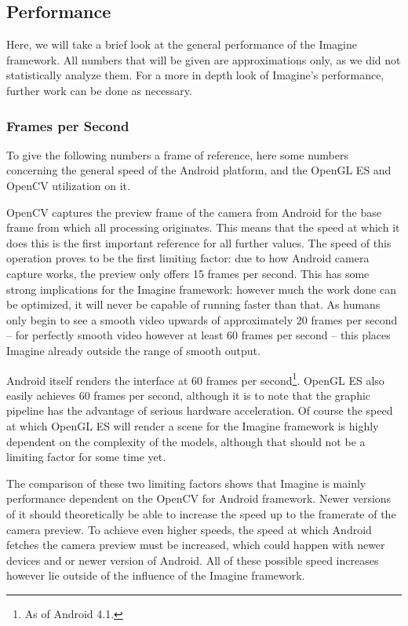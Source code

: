 \subsection{Performance}
\label{performance}

Here, we will take a brief look at the general performance of the Imagine framework.
All numbers that will be given are approximations only, as we did not statistically analyze them.
For a more in depth look of Imagine's performance, further work can be done as necessary.

\subsubsection{Frames per Second}

To give the following numbers a frame of reference, here some numbers concerning the general speed of the Android platform, and the OpenGL ES and OpenCV utilization on it.

OpenCV captures the preview frame of the camera from Android for the base frame from which all processing originates.
This means that the speed at which it does this is the first important reference for all further values.
The speed of this operation proves to be the first limiting factor: due to how Android camera capture works, the preview only offers 15 frames per second.
This has some strong implications for the Imagine framework: however much the work done can be optimized, it will never be capable of running faster than that.
As humans only begin to see a smooth video upwards of approximately 20 frames per second – for perfectly smooth video however at least 60 frames per second – this places Imagine already outside the range of smooth output.

Android itself renders the interface at 60 frames per second\footnote{As of Android 4.1.}.
OpenGL ES also easily achieves 60 frames per second, although it is to note that the graphic pipeline has the advantage of serious hardware acceleration.
Of course the speed at which OpenGL ES will render a scene for the Imagine framework is highly dependent on the complexity of the models, although that should not be a limiting factor for some time yet.

The comparison of these two limiting factors shows that Imagine is mainly performance dependent on the OpenCV for Android framework.
Newer versions of it should theoretically be able to increase the speed up to the framerate of the camera preview.
To achieve even higher speeds, the speed at which Android fetches the camera preview must be increased, which could happen with newer devices and or newer version of Android.
All of these possible speed increases however lie outside of the influence of the Imagine framework.

